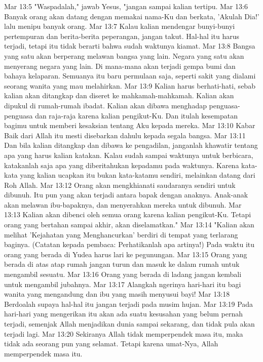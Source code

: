 Mar 13:5  "Waspadalah," jawab Yesus, "jangan sampai kalian tertipu.
Mar 13:6  Banyak orang akan datang dengan memakai nama-Ku dan berkata, 'Akulah Dia!' lalu menipu banyak orang.
Mar 13:7  Kalau kalian mendengar bunyi-bunyi pertempuran dan berita-berita peperangan, jangan takut. Hal-hal itu harus terjadi, tetapi itu tidak berarti bahwa sudah waktunya kiamat.
Mar 13:8  Bangsa yang satu akan berperang melawan bangsa yang lain. Negara yang satu akan menyerang negara yang lain. Di mana-mana akan terjadi gempa bumi dan bahaya kelaparan. Semuanya itu baru permulaan saja, seperti sakit yang dialami seorang wanita yang mau melahirkan.
Mar 13:9  Kalian harus berhati-hati, sebab kalian akan ditangkap dan diseret ke mahkamah-mahkamah. Kalian akan dipukul di rumah-rumah ibadat. Kalian akan dibawa menghadap penguasa-penguasa dan raja-raja karena kalian pengikut-Ku. Dan itulah kesempatan bagimu untuk memberi kesaksian tentang Aku kepada mereka.
Mar 13:10  Kabar Baik dari Allah itu mesti disebarkan dahulu kepada segala bangsa.
Mar 13:11  Dan bila kalian ditangkap dan dibawa ke pengadilan, janganlah khawatir tentang apa yang harus kalian katakan. Kalau sudah sampai waktunya untuk berbicara, katakanlah saja apa yang diberitahukan kepadamu pada waktunya. Karena kata-kata yang kalian ucapkan itu bukan kata-katamu sendiri, melainkan datang dari Roh Allah.
Mar 13:12  Orang akan mengkhianati saudaranya sendiri untuk dibunuh. Itu pun yang akan terjadi antara bapak dengan anaknya. Anak-anak akan melawan ibu-bapaknya, dan menyerahkan mereka untuk dibunuh.
Mar 13:13  Kalian akan dibenci oleh semua orang karena kalian pengikut-Ku. Tetapi orang yang bertahan sampai akhir, akan diselamatkan."
Mar 13:14  "Kalian akan melihat 'Kejahatan yang Menghancurkan' berdiri di tempat yang terlarang baginya. (Catatan kepada pembaca: Perhatikanlah apa artinya!) Pada waktu itu orang yang berada di Yudea harus lari ke pegunungan.
Mar 13:15  Orang yang berada di atas atap rumah jangan turun dan masuk ke dalam rumah untuk mengambil sesuatu.
Mar 13:16  Orang yang berada di ladang jangan kembali untuk mengambil jubahnya.
Mar 13:17  Alangkah ngerinya hari-hari itu bagi wanita yang mengandung dan ibu yang masih menyusui bayi!
Mar 13:18  Berdoalah supaya hal-hal itu jangan terjadi pada musim hujan.
Mar 13:19  Pada hari-hari yang mengerikan itu akan ada suatu kesusahan yang belum pernah terjadi, semenjak Allah menjadikan dunia sampai sekarang, dan tidak pula akan terjadi lagi.
Mar 13:20  Sekiranya Allah tidak memperpendek masa itu, maka tidak ada seorang pun yang selamat. Tetapi karena umat-Nya, Allah memperpendek masa itu.
